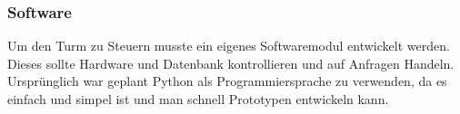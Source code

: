 \subsubsection{Software}

Um den Turm zu Steuern musste ein eigenes Softwaremodul entwickelt werden. Dieses sollte Hardware und Datenbank kontrollieren und auf Anfragen Handeln. Ursprünglich war geplant Python als Programmiersprache zu verwenden, da es einfach und simpel ist und man schnell Prototypen entwickeln kann.








